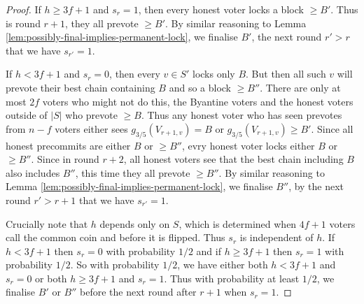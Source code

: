 \documentclass{article}
\begin{document}
\begin{proof}
If $h \geq 3f+1$ and $s_r=1$, then every honest voter locks a block $\geq B'$. Thus is round $r+1$, they all prevote $\geq B'$.
 By similar reasoning to Lemma \ref{lem:possibly-final-implies-permanent-lock}, we finalise $B'$, the next round $r' > r$ that we have $s_{r'}=1$.
 
If $h < 3f+1$ and $s_r=0$, then every $v \in S'$ locks only $B$. But then all such $v$ will prevote their best chain containing $B$ and so a block $\geq B''$. There are only at most $2f$ voters who might not do this, the Byantine voters and the honest voters outside of $|S|$ who prevote $\geq B$. Thus any honest voter who has seen prevotes from $n-f$ voters either sees $g_{3/5}(V_{r+1,v})=B$ or $g_{3/5}(V_{r+1,v}) \geq B'$. Since all honest precommits are either $B$ or $\geq B''$, evry honest voter locks either $B$ or $\geq B''$. Since in round $r+2$, all honest voters see that the best chain including $B$ also includes $B''$, this time they all prevote $\geq B''$.  By similar reasoning to Lemma \ref{lem:possibly-final-implies-permanent-lock}, we finalise $B''$, by the next round $r' > r+1$ that we have $s_{r'}=1$.

Crucially note that $h$ depends only on $S$, which is determined when $4f+1$ voters call the common coin and before it is flipped. Thus $s_r$ is independent of $h$. If $h < 3f+1$ then $s_r=0$ with probability $1/2$ and if $h \geq 3f+1$ then $s_r=1$ with probability $1/2$. So with probability $1/2$, we have either both $h < 3f+1$ and $s_r=0$ or both $h \geq 3f+1$ and $s_r=1$. Thus with probability at least $1/2$, we finalise $B'$ or $B''$ before the next round after $r+1$ when $s_r=1$.
\end{proof}


\end{document}
